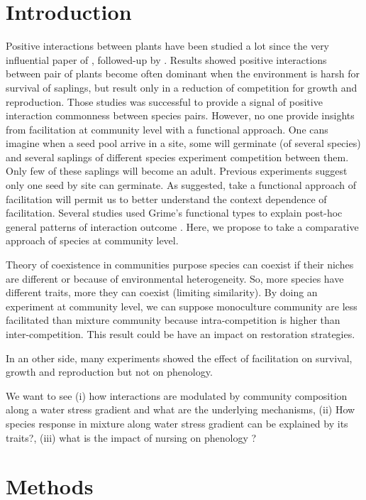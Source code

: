 \documentclass[12pt]{article} %
\begin{document}
\section{Introduction}

Positive interactions between plants have been studied a lot since the very influential paper of \citep{Bertness1994}, followed-up by \citep{Bruno2003}. Results showed positive interactions between pair of plants become often dominant when the environment is harsh for survival of saplings, but result only in a reduction of competition for growth and reproduction\citep{He2013}. Those studies was successful to provide a signal of positive interaction commonness between species pairs. However, no one provide insights from facilitation at community level with a functional approach. One cans imagine when a seed pool arrive in a site, some will germinate (of several species) and several saplings of different species experiment competition between them. Only few of these saplings will become an adult. Previous experiments suggest only one seed by site can germinate. As \citet{Butterfield2013} suggested, take a functional approach of facilitation will permit us to better understand the context dependence of facilitation. Several studies used Grime's functional types to explain post-hoc general patterns of interaction outcome \citep{Maestre2009,Butterfield2013}. Here, we propose to take a comparative approach of species at community level.

Theory of coexistence in communities purpose species can coexist if their niches are different or because of environmental heterogeneity. So, more species have different traits, more they can coexist (limiting similarity). By doing an experiment at community level, we can suppose monoculture community are less facilitated than mixture community because intra-competition is higher than inter-competition. This result could be have an impact on restoration strategies.

In an other side, many experiments showed the effect of facilitation on survival, growth and reproduction but not on phenology. 

We want to see (i) how interactions are modulated by community composition along a water stress gradient and what are the underlying mechanisms, (ii) How species response in mixture along water stress gradient can be explained by its traits?, (iii) what is the impact of nursing on phenology ?



\section{Methods}
\end{document}
